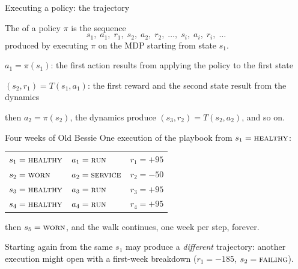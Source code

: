 \begin{frame}{Executing a policy: the trajectory}
\begin{lbox}
The  of a policy $\pi$ is the sequence
\[ s_1,\; a_1,\; r_1,\; s_2,\; a_2,\; r_2,\; \ldots,\; s_i,\; a_i,\; r_i,\; \ldots \]
produced by executing $\pi$ on the MDP starting from state $s_1$.
\end{lbox}
\pause
\begin{bullets}
\item $a_1 = \pi(s_1)$: the first action results from applying the policy to the first state
\pause
\item $(s_2, r_1) = T(s_1, a_1)$: the first reward and the second state result from the dynamics
\pause
\item then $a_2 = \pi(s_2)$, the dynamics produce $(s_3, r_2) = T(s_2, a_2)$, and so on.
\end{bullets}
\vspace{-2mm}
\end{frame}

\begin{frame}{Four weeks of Old Bessie}
One execution of the playbook from $s_1 = \textsc{healthy}$:
\begin{center}
\begin{tabular}{lll}
$s_1 = \textsc{healthy}$ & $a_1 = \textsc{run}$     & $r_1 = +95$ \\
$s_2 = \textsc{worn}$    & $a_2 = \textsc{service}$ & $r_2 = -50$ \\
$s_3 = \textsc{healthy}$ & $a_3 = \textsc{run}$     & $r_3 = +95$ \\
$s_4 = \textsc{healthy}$ & $a_4 = \textsc{run}$     & $r_4 = +95$ \\
\end{tabular}
\end{center}
then $s_5 = \textsc{worn}$, and the walk continues, one week per step, forever.
\pause
\begin{alertbox}
Starting again from the same $s_1$ may produce a \emph{different} trajectory: another execution might open with a first-week breakdown ($r_1 = -185$, $s_2 = \textsc{failing}$).
\end{alertbox}
\end{frame}


